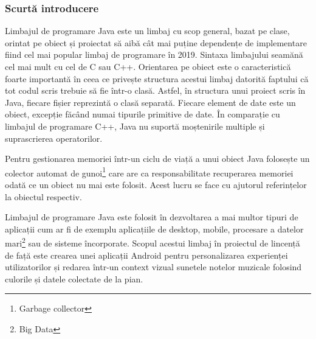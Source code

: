 \documentclass[../IoMusT.tex]{subfiles}
\begin{document}
\subsubsection{Scurtă introducere}
Limbajul de programare Java este un limbaj cu scop general, bazat pe clase, orintat pe obiect și proiectat să aibă	cât mai puține dependențe de implementare fiind cel mai popular limbaj de programare în 2019. Sintaxa limbajului seamănă cel mai mult cu cel de C sau C++. Orientarea pe obiect este o caracteristică foarte importantă în ceea ce privește structura acestui limbaj datorită faptului că tot codul scris trebuie să fie într-o clasă. Astfel, în structura unui proiect scris în Java, fiecare fișier reprezintă o clasă separată. Fiecare element de date este un obiect, excepție făcând numai tipurile primitive de date. În comparație cu limbajul de programare C++, Java nu suportă moștenirile multiple și suprascrierea operatorilor.
\\
\par Pentru gestionarea memoriei într-un ciclu de viață a unui obiect Java folosește un colector automat de gunoi\footnote{Garbage collector} care are ca responsabilitate recuperarea memoriei odată ce un obiect nu mai este folosit. Acest lucru se face cu ajutorul referințelor la obiectul respectiv.
\\
\par Limbajul de programare Java este folosit în dezvoltarea a mai multor tipuri de aplicații cum ar fi de exemplu aplicațiile de desktop, mobile, procesare a datelor mari\footnote{Big Data} sau de sisteme încorporate. Scopul acestui limbaj în proiectul de lincență de față este crearea unei aplicații Android pentru personalizarea experienței utilizatorilor și redarea într-un context vizual sunetele notelor muzicale folosind culorile și datele colectate de la pian.
\end{document}
